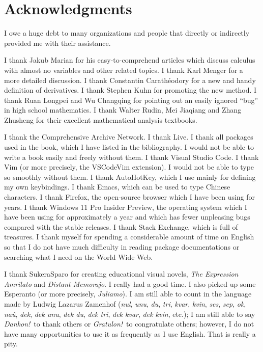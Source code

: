 \chapter{Acknowledgments}

I
owe a huge debt
to many organizations and people
that directly or indirectly provided me
with their assistance.

I thank Jakub Marian for his easy-to-comprehend articles
which discuss calculus with almost no variables
and other related topics.
I thank Karl Menger for a more detailed discussion.
I thank Constantin Carath\'eodory
for a new and handy definition of derivatives.
I thank Stephen Kuhn for promoting the new method.
I thank Ruan Long\-pei and Wu Chang\-qing
for pointing out an easily ignored ``bug''
in high school mathematics.
I thank Walter Rudin, Mei Jia\-qiang and Zhang Zhu\-sheng
for their excellent mathematical analysis textbooks.

I
thank the Comprehensive  Archive Network.
I thank  Live.
I thank all packages used in the book,
which I have listed in the bibliography.
I would not be able to write a book easily and freely
without them.
I thank Visual Studio Code.
I thank Vim (or more precisely, the VS\-Code\-Vim extension).
I would not be able to type so smoothly without them.
I thank AutoHotKey,
which I use mainly for defining my own keybindings.
I thank Emacs, which can be used to type Chinese characters.
I thank Firefox, the open-source browser
which I have been using for years.
I thank Windows 11 Pro Insider Preview,
the operating system which I have been using
for approximately a year
and which has fewer unpleasing bugs
compared with the stable releases.
I thank  Stack Exchange,
which is full of  treasures.
I thank myself for spending
a considerable amount of time on English
so that I do not have much difficulty
in reading package documentations
or searching what I need on the World Wide Web.

I thank Sukera\-Sparo for creating educational visual novels,
\textit{The Expression Amrilato}
and \textit{Distant Memora\^jo}.
I really had a good time.
I also picked up some Esperanto
(or more precisely, \textit{Juliamo}).
I am still able to count in the language
made by Ludwig Lazarus Zamenhof
(\textit{nul}, \textit{unu}, \textit{du}, \textit{tri},
\textit{kvar}, \textit{kvin}, \textit{ses}, \textit{sep},
\textit{ok}, \textit{na\^u}, \textit{dek}, \textit{dek unu},
\textit{dek du}, \textit{dek tri},
\textit{dek kvar}, \textit{dek kvin},
etc.);
I am still able to say \textit{Dankon!}\ to thank others
or \textit{Gratulon!}\ to congratulate others;
however, I do not have many opportunities
to use it as frequently as I use English.
That is really a pity.

